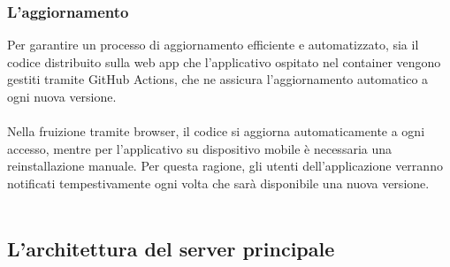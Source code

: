 \subsubsection{L'aggiornamento}
Per garantire un processo di aggiornamento efficiente e automatizzato,
sia il codice distribuito sulla web app che l’applicativo ospitato nel container vengono gestiti tramite GitHub Actions,
che ne assicura l’aggiornamento automatico a ogni nuova versione. \\
\\
Nella fruizione tramite browser, il codice si aggiorna automaticamente a ogni accesso, mentre per l’applicativo su dispositivo mobile è necessaria una reinstallazione manuale.
Per questa ragione, gli utenti dell’applicazione verranno notificati tempestivamente ogni volta che sarà disponibile una nuova versione.\\
\\
\clearpage
\subsection{L’architettura del server principale}

